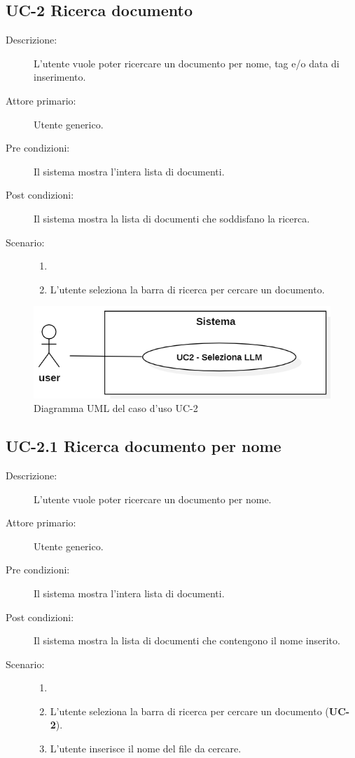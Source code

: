 \subsection{UC-2 Ricerca documento}
\begin{description}
    \item[Descrizione:] L’utente vuole poter ricercare un documento per nome, tag e/o data di inserimento.
    \item[Attore primario:] Utente generico.
    \item[Pre condizioni:] Il sistema mostra l’intera lista di documenti.
    \item[Post condizioni:] Il sistema mostra la lista di documenti che soddisfano la ricerca.
    \item[Scenario:]
    \begin{enumerate}
        \item[]
        \item L’utente seleziona la barra di ricerca per cercare un documento.
    \end{enumerate}
\end{description}

\begin{figure}[H]
    \centering
    \includegraphics[width=0.8\linewidth]{UC2.PNG} %
    \caption{Diagramma UML del caso d'uso UC-2}
    \label{fig:UC4}
\end{figure}

\subsection{UC-2.1 Ricerca documento per nome}
\begin{description}
    \item[Descrizione:] L’utente vuole poter ricercare un documento per nome.
    \item[Attore primario:] Utente generico.
    \item[Pre condizioni:] Il sistema mostra l’intera lista di documenti.
    \item[Post condizioni:] Il sistema mostra la lista di documenti che contengono il nome inserito.
    \item[Scenario:] 
    \begin{enumerate}
        \item[]
        \item L’utente seleziona la barra di ricerca per cercare un documento (\textbf{UC-2}).
        \item L’utente inserisce il nome del file da cercare.
    \end{enumerate}
\end{description}

